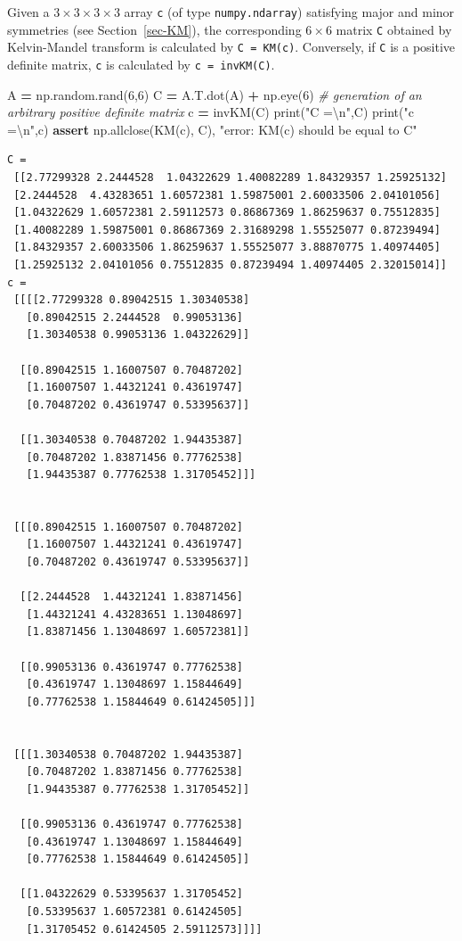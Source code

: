 \documentclass[
  a4paper,
  numbers=noendperiod,
  DIV=12]{scrreprt}
\newenvironment{Shaded}{\begin{snugshade}}{\end{snugshade}}
\newcommand{\BuiltInTok}[1]{#1}
\newcommand{\CharTok}[1]{\textcolor[rgb]{0.31,0.60,0.02}{#1}}
\newcommand{\CommentTok}[1]{\textcolor[rgb]{0.56,0.35,0.01}{\textit{#1}}}
\newcommand{\ControlFlowTok}[1]{\textcolor[rgb]{0.13,0.29,0.53}{\textbf{#1}}}
\newcommand{\DecValTok}[1]{\textcolor[rgb]{0.00,0.00,0.81}{#1}}
\newcommand{\NormalTok}[1]{#1}
\newcommand{\OperatorTok}[1]{\textcolor[rgb]{0.81,0.36,0.00}{\textbf{#1}}}
\newcommand{\StringTok}[1]{\textcolor[rgb]{0.31,0.60,0.02}{#1}}
\begin{document}
Given a \(3×3×3×3\) array \texttt{c} (of type \texttt{numpy.ndarray})
satisfying major and minor symmetries (see Section~\ref{sec-KM}), the
corresponding \(6×6\) matrix \texttt{C} obtained by Kelvin-Mandel
transform is calculated by \texttt{C\ =\ KM(c)}. Conversely, if
\texttt{C} is a positive definite matrix, \texttt{c} is calculated by
\texttt{c\ =\ invKM(C)}.

\begin{Shaded}
\begin{Highlighting}[]
\NormalTok{A }\OperatorTok{=}\NormalTok{ np.random.rand(}\DecValTok{6}\NormalTok{,}\DecValTok{6}\NormalTok{)}
\NormalTok{C }\OperatorTok{=}\NormalTok{ A.T.dot(A) }\OperatorTok{+}\NormalTok{ np.eye(}\DecValTok{6}\NormalTok{) }\CommentTok{\# generation of an arbitrary positive definite matrix}
\NormalTok{c }\OperatorTok{=}\NormalTok{ invKM(C)}
\BuiltInTok{print}\NormalTok{(}\StringTok{"C =}\CharTok{\textbackslash{}n}\StringTok{"}\NormalTok{,C)}
\BuiltInTok{print}\NormalTok{(}\StringTok{"c =}\CharTok{\textbackslash{}n}\StringTok{"}\NormalTok{,c)}
\ControlFlowTok{assert}\NormalTok{ np.allclose(KM(c), C), }\StringTok{"error: KM(c) should be equal to C"}
\end{Highlighting}
\end{Shaded}

\begin{verbatim}
C =
 [[2.77299328 2.2444528  1.04322629 1.40082289 1.84329357 1.25925132]
 [2.2444528  4.43283651 1.60572381 1.59875001 2.60033506 2.04101056]
 [1.04322629 1.60572381 2.59112573 0.86867369 1.86259637 0.75512835]
 [1.40082289 1.59875001 0.86867369 2.31689298 1.55525077 0.87239494]
 [1.84329357 2.60033506 1.86259637 1.55525077 3.88870775 1.40974405]
 [1.25925132 2.04101056 0.75512835 0.87239494 1.40974405 2.32015014]]
c =
 [[[[2.77299328 0.89042515 1.30340538]
   [0.89042515 2.2444528  0.99053136]
   [1.30340538 0.99053136 1.04322629]]

  [[0.89042515 1.16007507 0.70487202]
   [1.16007507 1.44321241 0.43619747]
   [0.70487202 0.43619747 0.53395637]]

  [[1.30340538 0.70487202 1.94435387]
   [0.70487202 1.83871456 0.77762538]
   [1.94435387 0.77762538 1.31705452]]]


 [[[0.89042515 1.16007507 0.70487202]
   [1.16007507 1.44321241 0.43619747]
   [0.70487202 0.43619747 0.53395637]]

  [[2.2444528  1.44321241 1.83871456]
   [1.44321241 4.43283651 1.13048697]
   [1.83871456 1.13048697 1.60572381]]

  [[0.99053136 0.43619747 0.77762538]
   [0.43619747 1.13048697 1.15844649]
   [0.77762538 1.15844649 0.61424505]]]


 [[[1.30340538 0.70487202 1.94435387]
   [0.70487202 1.83871456 0.77762538]
   [1.94435387 0.77762538 1.31705452]]

  [[0.99053136 0.43619747 0.77762538]
   [0.43619747 1.13048697 1.15844649]
   [0.77762538 1.15844649 0.61424505]]

  [[1.04322629 0.53395637 1.31705452]
   [0.53395637 1.60572381 0.61424505]
   [1.31705452 0.61424505 2.59112573]]]]
\end{verbatim}
\end{document}
